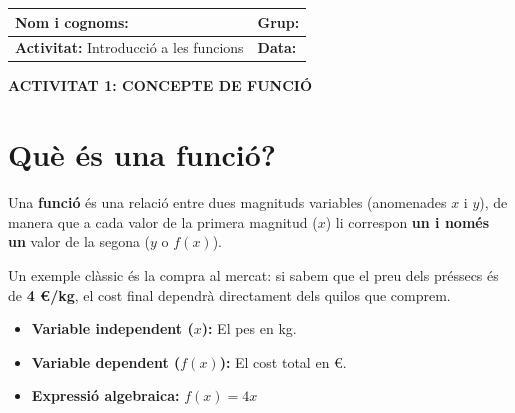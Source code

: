 \documentclass[12pt,a4paper]{article}
\begin{document}
\begingroup
\renewcommand{\arraystretch}{2.2}
\begin{tabularx}{\textwidth}{|X|p{4cm}|}
    \hline
    \textbf{Nom i cognoms:} & \textbf{Grup:} \\ \hline
    \textbf{Activitat:} Introducció a les funcions & \textbf{Data:} \\ \hline
\end{tabularx}
\endgroup

\vspace{0.5cm}

\begin{center}
    {\Large \textbf{ACTIVITAT 1: CONCEPTE DE FUNCIÓ}}
\end{center}

\section*{Què és una funció?}
Una \textbf{funció} és una relació entre dues magnituds variables (anomenades $x$ i $y$), de manera que a cada valor de la primera magnitud ($x$) li correspon \textbf{un i només un} valor de la segona ($y$ o $f(x)$).

Un exemple clàssic és la compra al mercat: si sabem que el preu dels préssecs és de \textbf{4 €/kg}, el cost final dependrà directament dels quilos que comprem.
\begin{itemize}
    \item \textbf{Variable independent ($x$):} El pes en kg.
    \item \textbf{Variable dependent ($f(x)$):} El cost total en €.
    \item \textbf{Expressió algebraica:} $f(x) = 4x$
\end{itemize}
\end{document}
